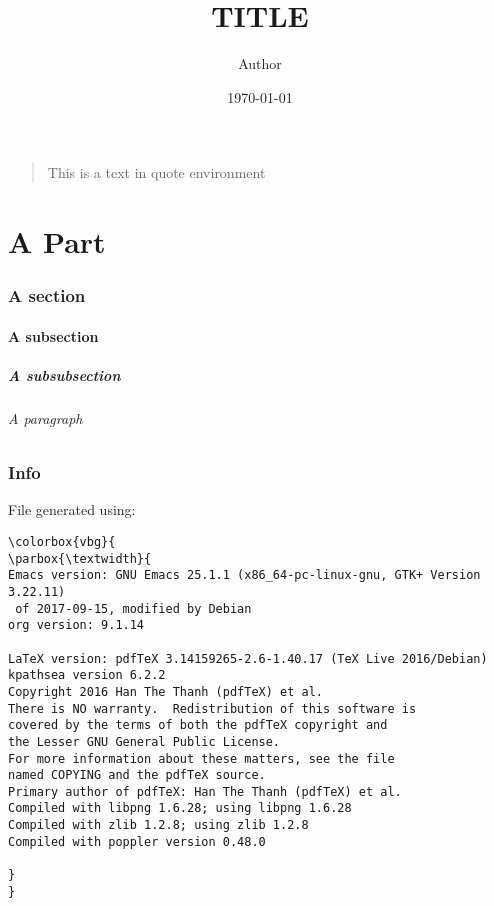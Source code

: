 \documentclass[a4paper, 12pt, english]{myreport}
\author{Author}
\date{\today}
\title{TITLE}
\begin{document}
\maketitle
\vspace{-2em}

\begin{quote}
This is a text in quote environment
\end{quote}

\tableofcontents
\newpage

\part{A Part}
\label{sec:org8ca247b}
\section{A section}
\label{sec:org57b5471}
\subsection{A subsection}
\label{sec:org727348d}
\subsubsection{A subsubsection}
\label{sec:org2d4e2cb}
\paragraph{A paragraph}
\label{sec:orgea13965}


\section*{Info}
\label{sec:orgc58a8c5}
File generated using:
\begin{Verbatim}[commandchars=\\\{\}]
\colorbox{vbg}{
\parbox{\textwidth}{
Emacs version: GNU Emacs 25.1.1 (x86_64-pc-linux-gnu, GTK+ Version 3.22.11)
 of 2017-09-15, modified by Debian
org version: 9.1.14

LaTeX version: pdfTeX 3.14159265-2.6-1.40.17 (TeX Live 2016/Debian)
kpathsea version 6.2.2
Copyright 2016 Han The Thanh (pdfTeX) et al.
There is NO warranty.  Redistribution of this software is
covered by the terms of both the pdfTeX copyright and
the Lesser GNU General Public License.
For more information about these matters, see the file
named COPYING and the pdfTeX source.
Primary author of pdfTeX: Han The Thanh (pdfTeX) et al.
Compiled with libpng 1.6.28; using libpng 1.6.28
Compiled with zlib 1.2.8; using zlib 1.2.8
Compiled with poppler version 0.48.0

}
}
\end{Verbatim}

\newpage
\nocite{*}


\printindex
\printindex[petrinet]
\end{document}
